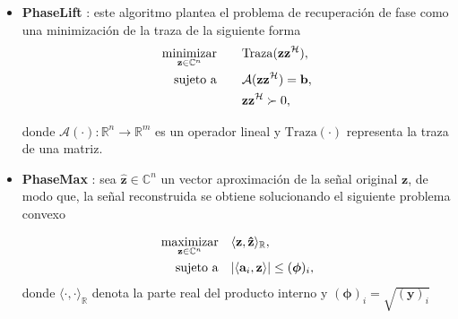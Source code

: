 \begin{itemize}
    \item \textbf{PhaseLift }:
    este algoritmo plantea el problema de recuperación de fase como una minimización de la traza de la siguiente forma
    \begin{equation}
        \begin{aligned}
            \operatorname*{minimizar}_{\mathbf{z} \in \mathbb{C}^{n}} \quad & \quad \mathrm{Traza}(\mathbf{z}\mathbf{z}^{\mathcal{H}}), \\
            \operatorname*{sujeto \ a} \quad & \quad \mathcal{A}(\mathbf{z}\mathbf{z}^{\mathcal{H}}) = \mathbf{b}, \\
             &\quad  \mathbf{z}\mathbf{z}^{\mathcal{H}} \succ 0,
        \end{aligned}
    \end{equation}
    
    donde $\mathcal{A}( \cdot ): \mathbb{R}^{n} \rightarrow \mathbb{R}^{m}$ es un operador lineal y $\mathrm{Traza}(\cdot)$ representa la traza de una matriz.
    
    \item \textbf{PhaseMax} :
    sea $\mathbf{\hat{z}} \in \mathbb{C}^{n}$ un vector aproximación de la señal original $\mathbf{z}$, de modo que, la señal reconstruida se obtiene solucionando el siguiente problema convexo
        
    \begin{equation}
        \begin{aligned}
            \operatorname*{maximizar}_{\mathbf{z}\in \mathbb{C}^n} \quad & \langle \mathbf{z}, \mathbf{\hat{z}} \rangle_{\mathbb{R}}, \\
            \operatorname*{sujeto \ a} \quad & \vert \langle \mathbf{a}_i,\mathbf{z} \rangle \vert \leq (\boldsymbol{\phi})_i,
        \end{aligned}
    \end{equation}
    donde $\langle \cdot, \cdot \rangle_{\mathbb{R}}$ denota la parte real del producto interno y $(\boldsymbol{\phi})_i = \sqrt{(\mathbf{y})_i}$
    
\end{itemize}

